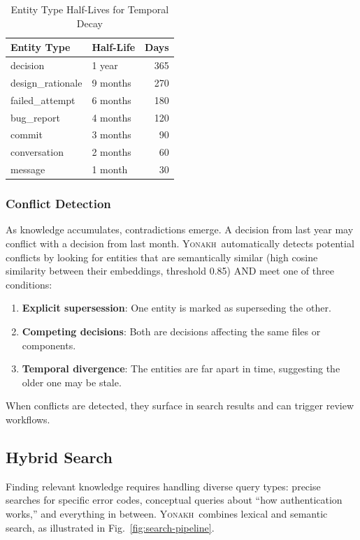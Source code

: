\documentclass[10pt,journal,compsoc]{IEEEtran}
\newcommand{\yonakh}{\textsc{Yonakh}}
\begin{document}
\begin{table}[t]
\caption{Entity Type Half-Lives for Temporal Decay}
\label{tab:halflife}
\centering
\small
\renewcommand{\arraystretch}{1.3}
\begin{tabular}{@{}p{} p{} r@{}}
\toprule
\textbf{Entity Type} & \textbf{Half-Life} & \textbf{Days} \\
\midrule
decision & 1 year & 365 \\
design\_rationale & 9 months & 270 \\
failed\_attempt & 6 months & 180 \\
bug\_report & 4 months & 120 \\
commit & 3 months & 90 \\
conversation & 2 months & 60 \\
message & 1 month & 30 \\
\bottomrule
\end{tabular}
\end{table}

\subsubsection{Conflict Detection}

As knowledge accumulates, contradictions emerge. A decision from last year may conflict with a decision from last month. \yonakh\ automatically detects potential conflicts by looking for entities that are semantically similar (high cosine similarity between their embeddings, threshold 0.85) AND meet one of three conditions:

\begin{enumerate}
\item \textbf{Explicit supersession}: One entity is marked as superseding the other.
\item \textbf{Competing decisions}: Both are decisions affecting the same files or components.
\item \textbf{Temporal divergence}: The entities are far apart in time, suggesting the older one may be stale.
\end{enumerate}

When conflicts are detected, they surface in search results and can trigger review workflows.

\subsection{Hybrid Search}

Finding relevant knowledge requires handling diverse query types: precise searches for specific error codes, conceptual queries about ``how authentication works,'' and everything in between. \yonakh\ combines lexical and semantic search, as illustrated in Fig.~\ref{fig:search-pipeline}.
\end{document}
